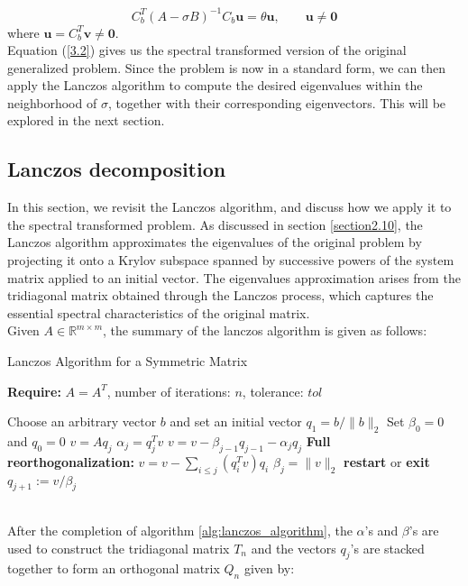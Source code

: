 \begin{equation}\label{3.3}
	C_b^T (A-\sigma B)^{-1} C_b \mathbf{u} = \theta \mathbf{u}, \qquad \mathbf{u} \neq \mathbf{0}
\end{equation}
where  $\mathbf{u} = C_b^T \mathbf{v} \neq \mathbf{0}.$\\
Equation (\ref{3.2}) gives us the spectral transformed version of the original generalized problem. Since the problem is now in a standard form, we can then apply the Lanczos algorithm to compute the desired eigenvalues within the neighborhood of $\sigma$, together with their corresponding eigenvectors. This will be explored in the next section.
\subsection{Lanczos decomposition}
In this section, we revisit the Lanczos algorithm, and discuss how we apply it to the spectral transformed problem. As discussed in section \ref{section2.10}, the Lanczos algorithm approximates the eigenvalues of the original problem by projecting it onto a Krylov subspace spanned by successive powers of the system matrix applied to an initial vector. The eigenvalues approximation arises from the tridiagonal matrix obtained through the Lanczos process, which captures the essential spectral characteristics of the original matrix.\\
Given $A \in \mathbb{R}^{m \times m}$, the summary of the lanczos algorithm is given as follows:
\begin{algorithm}
	\caption{Lanczos Algorithm for a Symmetric Matrix}
	\label{alg:lanczos_algorithm}

	\textbf{Require:} \( A = A^T \), number of iterations: \(n\), tolerance: \(tol\)
	\begin{algorithmic}[1]
		\State Choose an arbitrary vector $b$ and set an initial vector $q_1 = b/ \|b\|_2$ 
		\State Set $\beta_0 = 0$ and $q_0 = 0$
		\State $v = A q_j$
		\State $\alpha_j = q_j^T v $
		\State $v = v - \beta_{j-1}q_{j-1} - \alpha_j q_j$
		\State \textbf{Full reorthogonalization:} $v = v - \sum_{i \leq j} (q_i^T v) q_i$
		\State $\beta_{j} = \|v\|_2$
		\State \textbf{restart} or \textbf{exit}
		\EndIf
		\State $q_{j+1} := v / \beta_{j}$
		\EndFor
		\EndFunction
	\end{algorithmic}
\end{algorithm}\\
After the completion of algorithm \ref{alg:lanczos_algorithm}, the $\alpha$'s and $\beta$'s are used to construct the tridiagonal matrix $T_n$ and the vectors $q_j$'s are stacked together to form an orthogonal matrix $Q_n$ given by:
